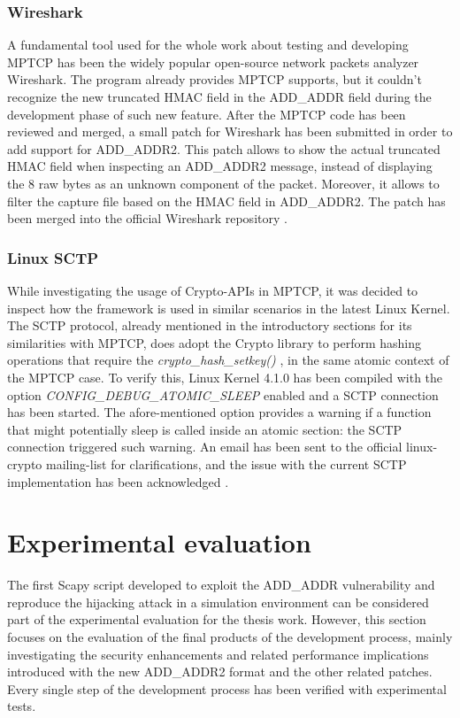 \subsubsection{Wireshark}
A fundamental tool used for the whole work about testing and developing MPTCP has been the widely popular open-source network packets analyzer Wireshark. The program already provides MPTCP supports, but it couldn't recognize the new truncated HMAC field in the ADD\_ADDR field during the development phase of such new feature. After the MPTCP code has been reviewed and merged, a small patch for Wireshark has been submitted in order to add support for ADD\_ADDR2. This patch allows to show the actual truncated HMAC field when inspecting an ADD\_ADDR2 message, instead of displaying the 8 raw bytes as an unknown component of the packet. Moreover, it allows to filter the capture file based on the HMAC field in ADD\_ADDR2. The patch has been merged into the official Wireshark repository \cite{wireshark}.

\subsubsection{Linux SCTP}
While investigating the usage of Crypto-APIs in MPTCP, it was decided to inspect how the framework is used in similar scenarios in the latest Linux Kernel. The SCTP protocol, already mentioned in the introductory sections for its similarities with MPTCP, does adopt the Crypto library to perform hashing operations that require the \textit{crypto\_hash\_setkey()} \cite{auth751}, in the same atomic context of the MPTCP case. To verify this, Linux Kernel 4.1.0 has been compiled with the option \textit{CONFIG\_DEBUG\_ATOMIC\_SLEEP} enabled and a SCTP connection has been started. The afore-mentioned option provides a warning if a function that might potentially sleep is called inside an atomic section: the SCTP connection triggered such warning. An email has been sent to the official linux-crypto mailing-list for clarifications, and the issue with the current SCTP implementation has been acknowledged \cite{cryptomail}.

\section{Experimental evaluation}
\label{exp}
The first Scapy script developed to exploit the ADD\_ADDR vulnerability and reproduce the hijacking attack in a simulation environment can be considered part of the experimental evaluation for the thesis work. However, this section focuses on the evaluation of the final products of the development process, mainly investigating the security enhancements and related performance implications introduced with the new ADD\_ADDR2 format and the other related patches.
Every single step of the development process has been verified with experimental tests.

